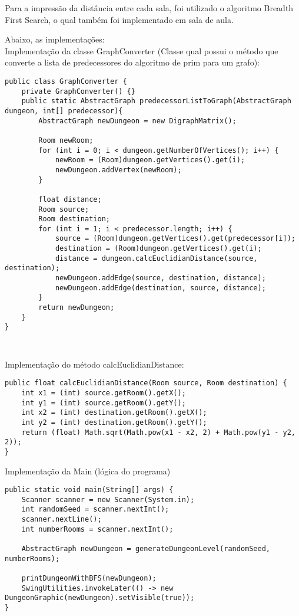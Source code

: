 \documentclass[a4paper, 12pt]{article}
\begin{document}
Para a impressão da distância entre cada sala, foi utilizado o algoritmo Breadth First Search, o qual também foi implementado em sala de aula.

Abaixo, as implementações:\\

Implementação da classe GraphConverter (Classe qual possui o método que converte a lista de predecessores do algoritmo de prim para um grafo):


\begin{verbatim}
public class GraphConverter {
    private GraphConverter() {}
    public static AbstractGraph predecessorListToGraph(AbstractGraph dungeon, int[] predecessor){
        AbstractGraph newDungeon = new DigraphMatrix();

        Room newRoom;
        for (int i = 0; i < dungeon.getNumberOfVertices(); i++) {
            newRoom = (Room)dungeon.getVertices().get(i);
            newDungeon.addVertex(newRoom);
        }

        float distance;
        Room source;
        Room destination;
        for (int i = 1; i < predecessor.length; i++) {
            source = (Room)dungeon.getVertices().get(predecessor[i]);
            destination = (Room)dungeon.getVertices().get(i);
            distance = dungeon.calcEuclidianDistance(source, destination);
            newDungeon.addEdge(source, destination, distance);
            newDungeon.addEdge(destination, source, distance);
        }
        return newDungeon;
    }
}
\end{verbatim}


\begin{verbatim}
  
\end{verbatim}

Implementação do método calcEuclidianDistance:

\begin{verbatim}
public float calcEuclidianDistance(Room source, Room destination) {
    int x1 = (int) source.getRoom().getX();
    int y1 = (int) source.getRoom().getY();
    int x2 = (int) destination.getRoom().getX();
    int y2 = (int) destination.getRoom().getY();
    return (float) Math.sqrt(Math.pow(x1 - x2, 2) + Math.pow(y1 - y2, 2));
}
\end{verbatim}

Implementação da Main (lógica do programa)

\begin{verbatim}
public static void main(String[] args) {
    Scanner scanner = new Scanner(System.in);
    int randomSeed = scanner.nextInt();
    scanner.nextLine();
    int numberRooms = scanner.nextInt();

    AbstractGraph newDungeon = generateDungeonLevel(randomSeed, numberRooms);

    printDungeonWithBFS(newDungeon);
    SwingUtilities.invokeLater(() -> new DungeonGraphic(newDungeon).setVisible(true));
}
\end{verbatim}
\end{document}
